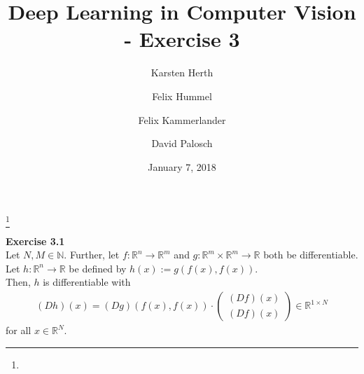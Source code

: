 \documentclass[a4paper, reqno]{amsart}
\newcommand{\R}{\mathbb R}
\newcommand{\N}{\mathbb N}
\theoremstyle{definition}
\numberwithin{equation}{section}
\begin{document}
\title[Exercise 1]
{Deep Learning in Computer Vision - Exercise 3}
\author{Karsten Herth}
\author{Felix Hummel}
\author{Felix Kammerlander}
\author{David Palosch}
\thanks{}
\date{January 7, 2018}

\maketitle

{\bf Exercise 3.1} \\
Let $N, M \in \N.$ Further, let $f\colon \R^n \to \R^m$ and $g\colon \R^m \times \R^m \to \R$ both be differentiable. Let $h \colon \R^n \to \R$ be defined by
$h(x) := g(f(x), f(x)).$ \\
Then, $h$ is differentiable with
\begin{align*}
	(Dh)(x) = (Dg)(f(x), f(x)) \cdot \begin{pmatrix} (Df)(x) \\ (Df)(x) \end{pmatrix} \in \R^{1 \times N}
\end{align*}
for all $x \in \R^N.$
\end{document}
